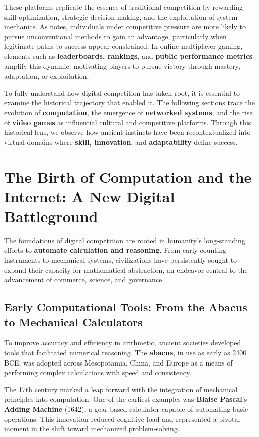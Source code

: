 These platforms replicate the essence of traditional competition by rewarding skill optimization, strategic decision-making, and the exploitation of system mechanics. As \textcite{murdock2001cheating} notes, individuals under competitive pressure are more likely to pursue unconventional methods to gain an advantage, particularly when legitimate paths to success appear constrained. In online multiplayer gaming, elements such as \textbf{leaderboards, rankings}, and \textbf{public performance metrics} amplify this dynamic, motivating players to pursue victory through mastery, adaptation, or exploitation.

To fully understand how digital competition has taken root, it is essential to examine the historical trajectory that enabled it. The following sections trace the evolution of \textbf{computation}, the emergence of \textbf{networked systems}, and the rise of \textbf{video games} as influential cultural and competitive platforms. Through this historical lens, we observe how ancient instincts have been recontextualized into virtual domains where \textbf{skill, innovation}, and \textbf{adaptability} define success.

\section{The Birth of Computation and the Internet: A New Digital Battleground}

The foundations of digital competition are rooted in humanity’s long-standing efforts to \textbf{automate calculation and reasoning}. From early counting instruments to mechanical systems, civilizations have persistently sought to expand their capacity for mathematical abstraction, an endeavor central to the advancement of commerce, science, and governance.

\subsection{Early Computational Tools: From the Abacus to Mechanical Calculators}

To improve accuracy and efficiency in arithmetic, ancient societies developed tools that facilitated numerical reasoning. The \textbf{abacus}, in use as early as 2400 BCE, was adopted across Mesopotamia, China, and Europe as a means of performing complex calculations with speed and consistency.

The 17th century marked a leap forward with the integration of mechanical principles into computation. One of the earliest examples was \textbf{Blaise Pascal}’s \textbf{Adding Machine} (1642), a gear-based calculator capable of automating basic operations. This innovation reduced cognitive load and represented a pivotal moment in the shift toward mechanized problem-solving.

